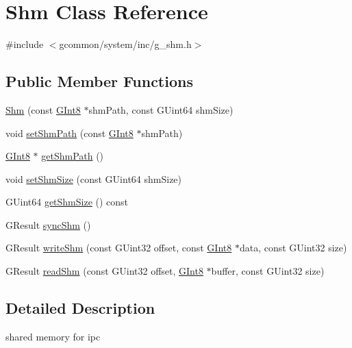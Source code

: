 \hypertarget{class_shm}{\section{Shm Class Reference}
\label{class_shm}
}


{\ttfamily \#include $<$gcommon/system/inc/g\-\_\-shm.\-h$>$}

\subsection*{Public Member Functions}
\begin{DoxyCompactItemize}
\item 
\hyperlink{class_shm_a0a127337c0f6906eda6c6207a972d523}{Shm} (const \hyperlink{g__type_8h_ad1732c0e4cf5d108f232e44a1179e8b0}{G\-Int8} $\ast$shm\-Path, const G\-Uint64 shm\-Size)
\item 
void \hyperlink{class_shm_aea75252eb2b613cbee7a869d2c534b20}{set\-Shm\-Path} (const \hyperlink{g__type_8h_ad1732c0e4cf5d108f232e44a1179e8b0}{G\-Int8} $\ast$shm\-Path)
\item 
\hyperlink{g__type_8h_ad1732c0e4cf5d108f232e44a1179e8b0}{G\-Int8} $\ast$ \hyperlink{class_shm_a98284e711acad9fe24a10191d2bedcd9}{get\-Shm\-Path} ()
\item 
void \hyperlink{class_shm_ae8a97b4f184bf40ee541b6bab969b4b0}{set\-Shm\-Size} (const G\-Uint64 shm\-Size)
\item 
G\-Uint64 \hyperlink{class_shm_abfbaf5c9578df7f7b7d9532ba12c3a2a}{get\-Shm\-Size} () const 
\item 
G\-Result \hyperlink{class_shm_af02357e3e7a61a2d8473883bfb5eaadd}{sync\-Shm} ()
\item 
G\-Result \hyperlink{class_shm_a260079dd828124a3f7fd2ded10d0d6bb}{write\-Shm} (const G\-Uint32 offset, const \hyperlink{g__type_8h_ad1732c0e4cf5d108f232e44a1179e8b0}{G\-Int8} $\ast$data, const G\-Uint32 size)
\item 
G\-Result \hyperlink{class_shm_a22e8315282bae8476920bd418578fe72}{read\-Shm} (const G\-Uint32 offset, \hyperlink{g__type_8h_ad1732c0e4cf5d108f232e44a1179e8b0}{G\-Int8} $\ast$buffer, const G\-Uint32 size)
\end{DoxyCompactItemize}


\subsection{Detailed Description}
shared memory for ipc 

